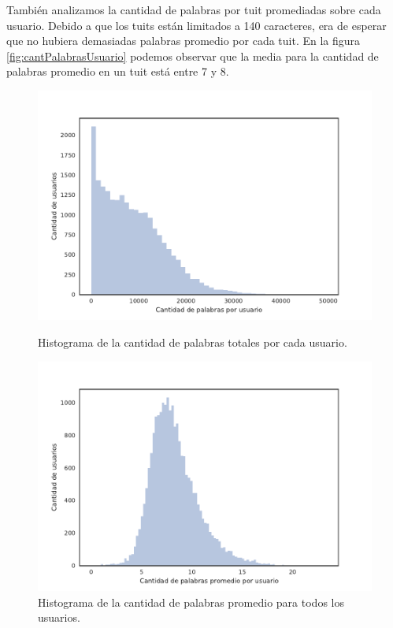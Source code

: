 También analizamos la cantidad de palabras por tuit promediadas sobre cada usuario.
Debido a que los tuits están limitados a 140 caracteres, era de esperar que no hubiera demasiadas palabras promedio por cada tuit. En la figura \ref{fig:cantPalabrasUsuario} podemos observar que la media para la cantidad de palabras promedio en un tuit está entre 7 y 8.
\begin{figure}[!ht]\centering
  \begin{minipage}{0.49\textwidth}
    \includegraphics[width=\linewidth]{./images/train/conFiltro/cantPalabrasUsuario.pdf}
    \caption{Histograma de la cantidad de palabras totales por cada usuario.} 
    \label{fig:cantPalabrasUsuario} 
   \end{minipage}
   \begin{minipage}{0.49\textwidth}
    \includegraphics[width=\linewidth]{./images/train/conFiltro/cantPalabrasPromedio.pdf}
    \caption{Histograma de la cantidad de palabras promedio para todos los usuarios.} 
    \label{fig:cantPalabrasPromedio} 
   \end{minipage}
   
\end{figure}

